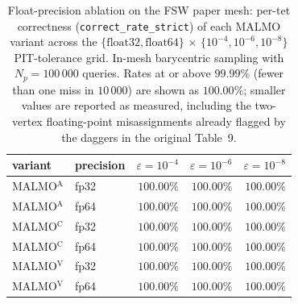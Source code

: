 \begin{table}[t]
\centering\small
\caption{Float-precision ablation on the FSW paper mesh: per-tet correctness (\texttt{correct\_rate\_strict}) of each MALMO variant across the $\{\text{float32}, \text{float64}\}$ $\times$ $\{10^{-4}, 10^{-6}, 10^{-8}\}$ PIT-tolerance grid.  In-mesh barycentric sampling with $N_p = 100\,000$ queries.  Rates at or above $99.99\%$ (fewer than one miss in $10\,000$) are shown as $100.00\%$; smaller values are reported as measured, including the two-vertex floating-point misassignments already flagged by the daggers in the original Table~9.}
\label{tab:r1g-float-FSW-paper}
\begin{tabular}{llrrr}
\toprule
variant & precision & $\varepsilon{=}10^{-4}$ & $\varepsilon{=}10^{-6}$ & $\varepsilon{=}10^{-8}$ \\
\midrule
MALMO$^{\mathrm{A}}$ & fp32 & $100.00\%$ & $100.00\%$ & $100.00\%$ \\
MALMO$^{\mathrm{A}}$ & fp64 & $100.00\%$ & $100.00\%$ & $100.00\%$ \\
\midrule
MALMO$^{\mathrm{C}}$ & fp32 & $100.00\%$ & $100.00\%$ & $100.00\%$ \\
MALMO$^{\mathrm{C}}$ & fp64 & $100.00\%$ & $100.00\%$ & $100.00\%$ \\
\midrule
MALMO$^{\mathrm{V}}$ & fp32 & $100.00\%$ & $100.00\%$ & $100.00\%$ \\
MALMO$^{\mathrm{V}}$ & fp64 & $100.00\%$ & $100.00\%$ & $100.00\%$ \\
\bottomrule
\end{tabular}
\end{table}
